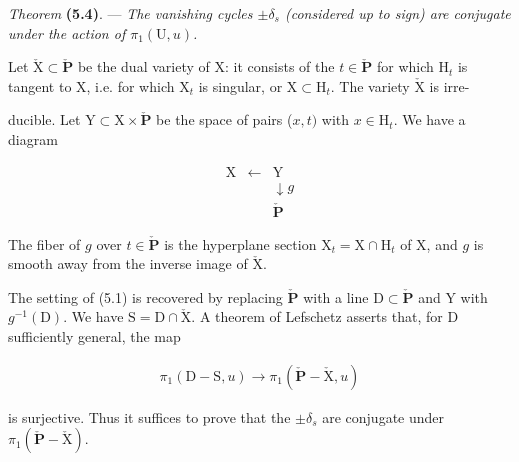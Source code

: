 \documentclass[10pt,leqno]{article}
\begin{document}
\noindent \emph{Theorem} \textbf{(5.4)}. — {\itshape The vanishing cycles \(\pm \delta _{s}\) (considered up to sign) are conjugate under the action of \(\pi _{1}(\mathrm{U},u)\).}\par

\noindent Let \(\check{\mathrm{X}}\subset \check{\mathbf{P}}\) be the dual variety of \(\mathrm{X}\): it consists of the \(t\in \check{\mathbf{P}}\) for which \(\mathrm{H}_{t}\) is tangent to \(\mathrm{X}\), i.e. for which \(\mathrm{X}_{t}\) is singular, or \(\mathrm{X}\subset \mathrm{H}_{t}\). The variety \(\check{\mathrm{X}}\) is irre-\par

\clearpage

\label{physical-20}

\noindent ducible. Let \(\mathrm{Y}\subset \mathrm{X}\times \check{\mathbf{P}}\) be the space of pairs (\(x,t)\) with \(x\in \mathrm{H}_{t}\). We have a diagram\par

\[\begin{array}{ccc}\mathrm X&\xleftarrow{}&\mathrm Y\\ &&\downarrow\!{g}\\ &&\check{\mathbf P}\end{array}\]

\noindent The fiber of \(g\) over \(t\in \check{\mathbf{P}}\) is the hyperplane section \(\mathrm{X}_{t}=\mathrm{X}\cap \mathrm{H}_{t}\) of \(\mathrm{X}\), and \(g\) is smooth away from the inverse image of \(\check{\mathrm{X}}\).\par

\noindent The setting of (5.1) is recovered by replacing \(\check{\mathbf{P}}\) with a line \(\mathrm{D}\subset \check{\mathbf{P}}\) and \(\mathrm{Y}\) with \(g^{- 1}(\mathrm{D})\). We have \(\mathrm{S}=\mathrm{D}\cap \check{\mathrm{X}}\). A theorem of Lefschetz asserts that, for \(\mathrm{D}\) sufficiently general, the map\par

\begin{equation*}\begin{gathered}\pi _{1}(\mathrm{D}- \mathrm{S},u) \longrightarrow  \pi _{1}(\check{\mathbf{P}}- \check{\mathrm{X}},u)\end{gathered}\end{equation*}

\noindent is surjective. Thus it suffices to prove that the \(\pm \delta _{s}\) are conjugate under \(\pi _{1}(\check{\mathbf{P}}- \check{\mathrm{X}})\).\par
\end{document}
